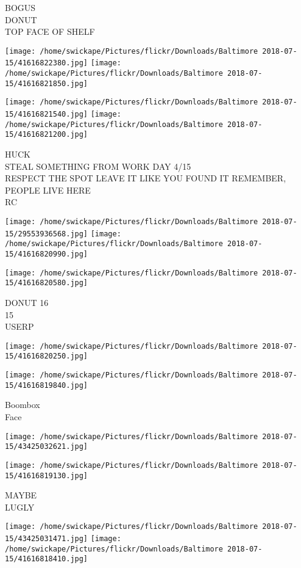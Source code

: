 \documentclass[10pt,letterpaper]{article}
\begin{document}
BOGUS\\
DONUT\\
TOP FACE OF SHELF
\pagebreak

\texttt{[image: /home/swickape/Pictures/flickr/Downloads/Baltimore 2018-07-15/41616822380.jpg]}
\texttt{[image: /home/swickape/Pictures/flickr/Downloads/Baltimore 2018-07-15/41616821850.jpg]}

\texttt{[image: /home/swickape/Pictures/flickr/Downloads/Baltimore 2018-07-15/41616821540.jpg]}
\texttt{[image: /home/swickape/Pictures/flickr/Downloads/Baltimore 2018-07-15/41616821200.jpg]}

HUCK\\
STEAL SOMETHING FROM WORK DAY 4/15\\
RESPECT THE SPOT LEAVE IT LIKE YOU FOUND IT REMEMBER, PEOPLE LIVE HERE\\
RC
\pagebreak

\texttt{[image: /home/swickape/Pictures/flickr/Downloads/Baltimore 2018-07-15/29553936568.jpg]}
\texttt{[image: /home/swickape/Pictures/flickr/Downloads/Baltimore 2018-07-15/41616820990.jpg]}

\vspace{0.25in}
\texttt{[image: /home/swickape/Pictures/flickr/Downloads/Baltimore 2018-07-15/41616820580.jpg]}

DONUT 16\\
15\\
USERP
\pagebreak

\texttt{[image: /home/swickape/Pictures/flickr/Downloads/Baltimore 2018-07-15/41616820250.jpg]}

\vspace{0.25in}
\texttt{[image: /home/swickape/Pictures/flickr/Downloads/Baltimore 2018-07-15/41616819840.jpg]}

Boombox\\
Face
\pagebreak

\texttt{[image: /home/swickape/Pictures/flickr/Downloads/Baltimore 2018-07-15/43425032621.jpg]}

\vspace{0.25in}
\texttt{[image: /home/swickape/Pictures/flickr/Downloads/Baltimore 2018-07-15/41616819130.jpg]}

MAYBE\\
LUGLY
\pagebreak

\texttt{[image: /home/swickape/Pictures/flickr/Downloads/Baltimore 2018-07-15/43425031471.jpg]}
\texttt{[image: /home/swickape/Pictures/flickr/Downloads/Baltimore 2018-07-15/41616818410.jpg]}
\end{document}
